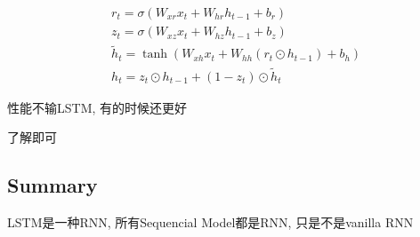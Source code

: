 	\[
	\begin{aligned}
		&r_{t} =\sigma(W_{xr}x_t+W_{hr}h_{t-1}+b_r)  \\
		&z_{t} =\sigma(W_{xz}x_t+W_{hz}h_{t-1}+b_z)  \\
		&\tilde{h}_{t} =\tanh(W_{xh}x_t+W_{hh}(r_t\odot h_{t-1})+b_h)  \\
		&h_t =z_t\odot h_{t-1}+(1-z_t)\odot\tilde{h}_t 
	\end{aligned}	
	\]

	性能不输LSTM, 有的时候还更好

	了解即可

	\subsection{Summary}

	LSTM是一种RNN, 所有Sequencial Model都是RNN, 只是不是vanilla RNN